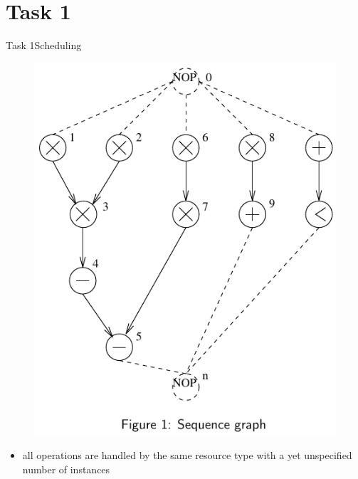 
\section{Task 1}

\setcounter{task}{1}

\begin{frame}[allowframebreaks]{Task 1}{Scheduling}
  \begin{tasknoinc}
    \begin{figure}
      \centering
      \includegraphics[height=0.6\paperheight]{./figures/task1_sequence_graph.png}
    \end{figure}
  \end{tasknoinc}
  \begin{tasknoinc}
    \begin{itemize}
      \item all operations are handled by the same resource type with a yet unspecified number of instances

\end{itemize}
\end{tasknoinc}
\end{frame}
